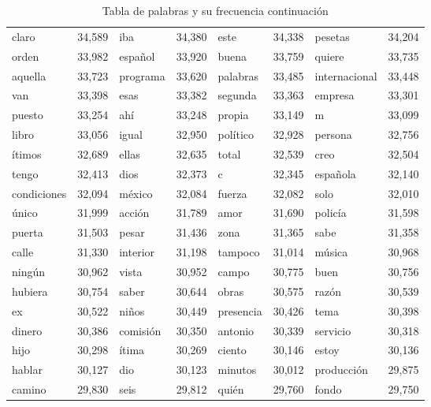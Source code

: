 \begin{table}
\begin{tabular}{|l|l|l|l|l|l|l|l|}
   claro	&   34,589	   &
   iba	&   34,380	   &
   este	 &  34,338	   &
   pesetas &	   34,204	   \\
   orden	&   33,982	   &
   espa\~nol 	&   33,920 &
   buena &	   33,759	   &
   quiere	&   33,735	   \\
   aquella	 &  33,723	   &
   programa 	&   33,620	   &
   palabras	 &  33,485	   &
   internacional	&   33,448	  \\
   van	 &  33,398	  &
   esas 	&   33,382	   &
   segunda 	 &  33,363	 &
   empresa 	 &  33,301	  \\
   puesto 	 &  33,254	&
   ah\'i	 &  33,248	 &
   propia	 &  33,149	  &
   m 	 &  33,099	  \\
   libro	&   33,056	   &
   igual	 &  32,950 &
   pol\'itico	&   32,928	   &
   persona 	 &  32,756	   \\
   \'itimos	 &  32,689	   &
   ellas	 &  32,635	&
   total	 &  32,539	 &
   creo	  & 32,504	   \\
   tengo	&   32,413	   &
   dios	  & 32,373	   &
   c	 &  32,345	   &
   espa\~nola &	   32,140	   \\
   condiciones &	   32,094	&
   m\'exico 	&   32,084	   &
   fuerza	  & 32,082	   &
   solo	  & 32,010	   \\
   \'unico	&   31,999	   &
   acci\'on	 &  31,789	 &
   amor 	 &  31,690	&
   polic\'ia	&   31,598	  \\
   puerta	  & 31,503	  &
   pesar	  & 31,436	  &
   zona 	  & 31,365	 &
   sabe 	  & 31,358	  \\
   calle	  & 31,330	   &
   interior	  & 31,198	 &
   tampoco 	  & 31,014	  &
   m\'usica &	   30,968	   \\
   ning\'un	 &  30,962	   &
   vista	 &  30,952	 &
   campo  	 &  30,775	   &
   buen 	 &  30,756	  \\
   hubiera	 &  30,754	 &
   saber	 &  30,644	  &
   obras	 &  30,575	 &
   raz\'on	 &  30,539	 \\
   ex	  & 30,522	   &
   ni\~nos	&   30,449	   &
   presencia	&   30,426	   &
   tema 	  & 30,398	  \\
   dinero	  & 30,386	   &
   comisi\'on 	&   30,350	   &
   antonio	  & 30,339	   &
   servicio	  & 30,318	   \\
   hijo	  & 30,298	   &
   \'itima	&   30,269	   &
   ciento	 &  30,146	 &
   estoy	 &  30,136	  \\
   hablar	 &  30,127	   &
   dio	  & 30,123	   &
   minutos &	   30,012	   &
   producci\'on &	   29,875	   \\
   camino 	  & 29,830	 &
   seis	  & 29,812	   &
   qui\'en	&   29,760	   &   
   fondo	 &  29,750	   \\
   
   
      	\hline
   


\end{tabular}
\caption{Tabla de palabras y su frecuencia continuaci\'on} 
\end{table}


